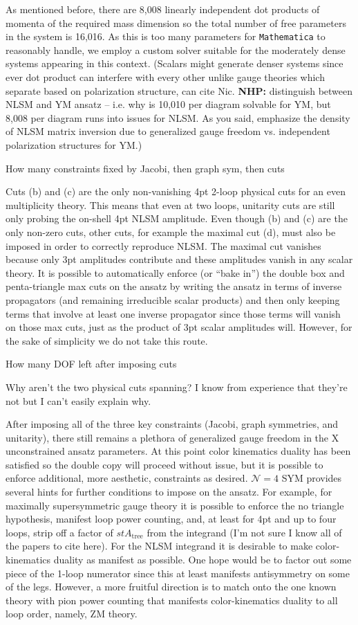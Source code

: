 \documentclass[11pt,letter]{article}
\newcommand{\nhp}[1]{\textcolor{nhpRed}{\textbf{NHP:}{#1}}}
\begin{document}
As mentioned before, there are 8,008 linearly independent dot products of momenta of the required mass dimension so the total number of free parameters in the system is 16,016.
As this is too many parameters for \texttt{Mathematica} to reasonably handle, we employ a custom solver suitable for the moderately dense systems appearing in this context.
(Scalars might generate denser systems since ever dot product can interfere with every other unlike gauge theories which separate based on polarization structure, can cite Nic. \nhp{ distinguish between NLSM and YM ansatz -- i.e. why is 10,010 per diagram solvable for YM, but 8,008 per diagram runs into issues for NLSM. As you said, emphasize the density of NLSM matrix inversion due to generalized gauge freedom vs. independent polarization structures for YM.})

How many constraints fixed by Jacobi, then graph sym, then cuts

Cuts (b) and (c) are the only non-vanishing 4pt 2-loop physical cuts for an even multiplicity theory.
This means that even at two loops, unitarity cuts are still only probing the on-shell 4pt NLSM amplitude.
Even though (b) and (c) are the only non-zero cuts, other cuts, for example the maximal cut (d), must also be imposed in order to correctly reproduce NLSM.
The maximal cut vanishes because only 3pt amplitudes contribute and these amplitudes vanish in any scalar theory.
It is possible to automatically enforce (or ``bake in'') the double box and penta-triangle max cuts on the ansatz by writing the ansatz in terms of inverse propagators (and remaining irreducible scalar products) and then only keeping terms that involve at least one inverse propagator since those terms will vanish on those max cuts, just as the product of 3pt scalar amplitudes will.
However, for the sake of simplicity we do not take this route.

How many DOF left after imposing cuts

Why aren't the two physical cuts spanning?  I know from experience that they're not but I can't easily explain why.

After imposing all of the three key constraints (Jacobi, graph symmetries, and unitarity), there still remains a plethora of generalized gauge freedom in the X unconstrained ansatz parameters.
At this point color kinematics duality has been satisfied so the double copy will proceed without issue, but it is possible to enforce additional, more aesthetic, constraints as desired.
$\mathcal{N}=4$ SYM provides several hints for further conditions to impose on the ansatz.
For example, for maximally supersymmetric gauge theory it is possible to enforce the no triangle hypothesis, manifest loop power counting, and, at least for 4pt and up to four loops, strip off a factor of $st A_\text{tree}$ from the integrand (I'm not sure I know all of the papers to cite here).
For the NLSM integrand it is desirable to make color-kinematics duality as manifest as possible.
One hope would be to factor out some piece of the 1-loop numerator since this at least manifests antisymmetry on some of the legs.
However, a more fruitful direction is to match onto the one known theory with pion power counting that manifests color-kinematics duality to all loop order, namely, ZM theory.
\end{document}

